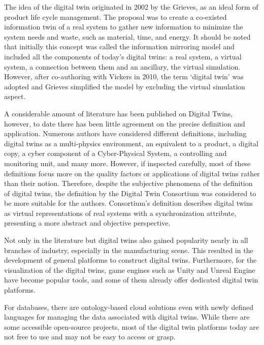 \documentclass[conference]{IEEEtran}
\begin{document}
    The idea of the digital twin originated in 2002 by the Grieves, as an ideal form of product life cycle management. 
    The proposal was to create a co-existed information twin of a real system to gather new information to minimize 
    the system needs and waste, such as material, time, and energy. It should be noted that initially this concept was 
    called the information mirroring model and included all the components of today's digital twins: a real system, 
    a virtual system, a connection between them and an ancillary, the virtual simulation. However, after co-authoring with Vickers in 2010, 
    the term `digital twin' was adopted and Grieves simplified the model by excluding the virtual simulation aspect.
    
    A considerable amount of literature has been published on Digital Twins, however, to date there has been little agreement on the precise definition and application. Numerous authors have considered different 
    definitions, including digital twins as a multi-physics environment, an equivalent to a product, a digital copy, a cyber component of a Cyber-Physical System, a controlling and monitoring unit,
    and many more. However, if inspected carefully, most of these definitions focus more on the quality factors or applications of digital twins rather than their notion.
    Therefore, despite the subjective phenomena of the definition of digital twins, the definition by the Digital Twin Consortium was considered to be more suitable for the authors. 
    Consortium's definition describes digital twins as virtual representations of real systems with a synchronization attribute,
    presenting a more abstract and objective perspective.\cite{asf}

    Not only in the literature but digital twins also gained popularity nearly in all branches of industry, especially in the manufacturing scene.  
    This resulted in the development of general platforms to construct digital twins. Furthermore, for the visualization of the digital twins, 
    game engines such as Unity and  Unreal Engine have become popular tools, and some of them already offer dedicated digital 
    twin platforms. 
    
    For databases, there are ontology-based cloud solutions even with newly defined languages for 
    managing the data associated with digital twins. While there are some accessible open-source projects, 
    most of the digital twin platforms today are not free to use and may not be easy to access or grasp. 
\end{document}
